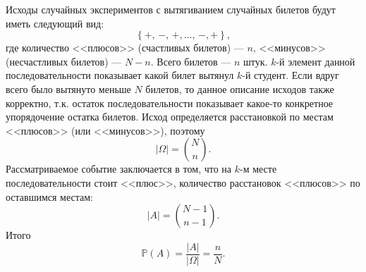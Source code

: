 \documentclass[a4paper]{article}
\title{}
\begin{document}
\begin{sol}
Исходы случайных экспериментов с вытягиванием случайных билетов будут иметь
следующий вид:
\[
	\left\{ +,\,-,\,+,\ldots,\,-,+ \right\} 
,\] 
где количество <<плюсов>> (счастливых билетов) --- $n$, <<минусов>> (несчастливых билетов) --- $N-n$. Всего билетов --- $n$ 
штук. $k$-й элемент данной последовательности показывает какой билет вытянул $k$-й
студент. Если вдруг всего было вытянуто меньше $N$ билетов, то данное описание исходов также корректно,
т.\:к. остаток последовательности показывает какое-то конкретное упорядочение остатка билетов.
Исход определяется расстановкой по местам <<плюсов>> (или <<минусов>>), поэтому
\[
	|\Omega|= \binom{N}{n}
.\]  
Рассматриваемое событие заключается в том, что на $k$-м месте последовательности стоит <<плюс>>, количество расстановок <<плюсов>> по оставшимся местам:
\[
	|A|= \binom{N-1}{n-1}
.\] 
Итого
\[
	\mathbb{P}(A)= \frac{|A|}{|\Omega|}= \frac{n}{N}
.\] 
\end{sol}
\end{document}
